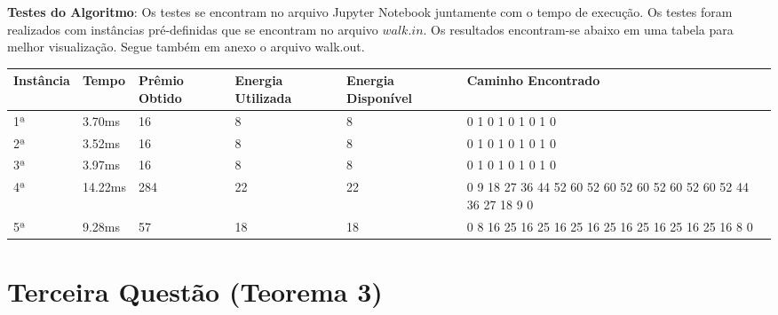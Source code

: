 \documentclass{article}
\begin{document}
\textbf{Testes do Algoritmo}: Os testes se encontram no arquivo Jupyter Notebook juntamente com o tempo de execução. Os testes foram realizados com instâncias pré-definidas que se encontram no arquivo $walk.in$. Os resultados encontram-se abaixo em uma tabela para melhor visualização. Segue também em anexo o arquivo walk.out.

\begin{table}[H]
\centering
\begin{tabular}{l|l|l|l|l|p{4cm}}
Instância & Tempo & Prêmio Obtido & Energia Utilizada & Energia Disponível & Caminho Encontrado\\\hline
1ª & 3.70ms & 16 & 8 & 8 & 0 1 0 1 0 1 0 1 0\\
2ª & 3.52ms & 16 & 8 & 8 & 0 1 0 1 0 1 0 1 0\\
3ª & 3.97ms & 16 & 8 & 8 & 0 1 0 1 0 1 0 1 0\\
4ª & 14.22ms & 284 & 22 & 22 & 0 9 18 27 36 44 52 60 52 60 52 60 52 60 52 60 52 44 36 27 18 9 0\\
5ª & 9.28ms & 57 & 18 & 18 & 0 8 16 25 16 25 16 25 16 25 16 25 16 25 16 25 16 8 0
\end{tabular}
\end{table}

\section{Terceira Questão (Teorema 3)}
\end{document}

